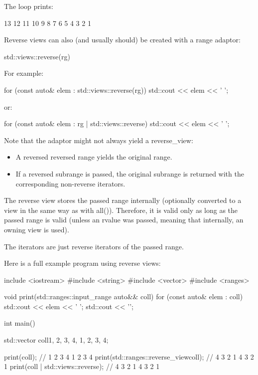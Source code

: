 The loop prints:

\begin{shell}
13 12 11 10 9 8 7 6 5 4 3 2 1
\end{shell}


Reverse views can also (and usually should) be created with a range adaptor:

\begin{cpp}
std::views::reverse(rg)
\end{cpp}

For example:

\begin{cpp}
for (const auto& elem : std::views::reverse(rg)) {
	std::cout << elem << ' ';
}
\end{cpp}

or:

\begin{cpp}
for (const auto& elem : rg | std::views::reverse) {
	std::cout << elem << ' ';
}
\end{cpp}

Note that the adaptor might not always yield a reverse\_view:

\begin{itemize}
\item
A reversed reversed range yields the original range.

\item
If a reversed subrange is passed, the original subrange is returned with the corresponding non-reverse iterators.
\end{itemize}

The reverse view stores the passed range internally (optionally converted to a view in the same way as with all()). Therefore, it is valid only as long as the passed range is valid (unless an rvalue was passed, meaning that internally, an owning view is used).

The iterators are just reverse iterators of the passed range.

Here is a full example program using reverse views:


\begin{cpp}
include <iostream>
#include <string>
#include <vector>
#include <ranges>

void print(std::ranges::input_range auto&& coll)
{
	for (const auto& elem : coll) {
		std::cout << elem << ' ';
	}
	std::cout << '\n';
}

int main()
{
	std::vector coll{1, 2, 3, 4, 1, 2, 3, 4};
	
	print(coll); // 1 2 3 4 1 2 3 4
	print(std::ranges::reverse_view{coll}); // 4 3 2 1 4 3 2 1
	print(coll | std::views::reverse); // 4 3 2 1 4 3 2 1
}
\end{cpp}

